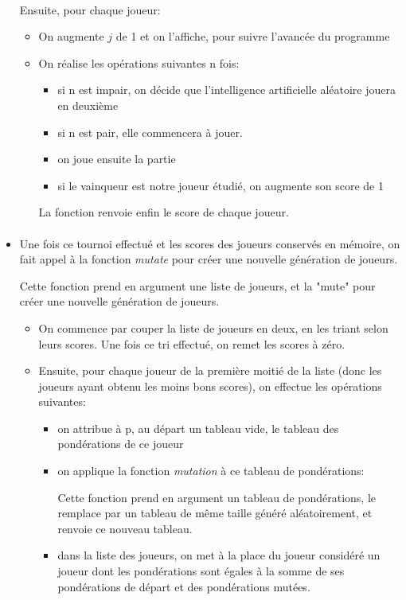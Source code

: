 \documentclass[10pt, french]{article}
\begin{document}
\begin{itemize}
\paragraph{}
Ensuite, pour chaque joueur: 
\begin{itemize}
    \item On augmente $j$ de 1 et on l'affiche, pour suivre l'avancée du programme
    \item On réalise les opérations suivantes n fois: 
    \begin{itemize}
        \item si n est impair, on décide que l'intelligence artificielle aléatoire jouera en deuxième
        \item si n est pair, elle commencera à jouer. 
        \item on joue ensuite la partie
        \item si le vainqueur est notre joueur étudié, on augmente son score de 1
    \end{itemize}
La fonction renvoie enfin le score de chaque joueur. 
\end{itemize}

\paragraph{}
\item Une fois ce tournoi effectué et les scores des joueurs conservés en mémoire, on fait appel à la fonction \textit{mutate} pour créer une nouvelle génération de joueurs. 
 
Cette fonction prend en argument une liste de joueurs, et la "mute" pour créer une nouvelle génération de joueurs. 
\begin{itemize}
    \item On commence par couper la liste de joueurs en deux, en les triant selon leurs scores. Une fois ce tri effectué, on remet les scores à zéro. \item Ensuite, pour chaque joueur de la première moitié de la liste (donc les joueurs ayant obtenu les moins bons scores), on effectue les opérations suivantes: 
    \begin{itemize}
        \item on attribue à p, au départ un tableau vide, le tableau des pondérations de ce joueur
        \item on applique la fonction \textit{mutation} à ce tableau de pondérations: 
        
        Cette fonction prend en argument un tableau de pondérations, le remplace par un tableau de même taille généré aléatoirement, et renvoie ce nouveau tableau. 
        \item dans la liste des joueurs, on met à la place du joueur considéré un joueur dont les pondérations sont égales à la somme de ses pondérations de départ et des pondérations mutées.  
    \end{itemize}

\end{itemize}
\end{itemize}
\end{document}
